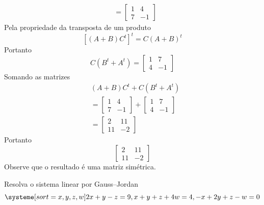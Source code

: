 \documentclass[a4paper,12pt,fleqn]{article}
\begin{document}
\begin{answer}
\begin{align*}
\\[2mm]
&=
\begin{bmatrix}
  1 & 4\\
  7 & -1
\end{bmatrix}
\end{align*}
Pela propriedade da transposta de um produto
\[
\left[(A+B)C^t\right]^t=C(A+B)^t
\]
Portanto
\[
C(B^t+A^t)=
\begin{bmatrix}
  1 & 7\\
  4 & -1
\end{bmatrix}
\]
Somando as matrizes
\begin{align*}
&(A+B)C^t+C(B^t+A^t)
\\[2mm]
&=
\begin{bmatrix}
  1 & 4\\
  7 & -1
\end{bmatrix}
+
\begin{bmatrix}
  1 & 7\\
  4 & -1
\end{bmatrix}
\\[2mm]
&=
\begin{bmatrix}
  2 & 11\\
  11 & -2
\end{bmatrix}
\end{align*}
Portanto
\[
\boxed{
\begin{bmatrix}
  2 & 11\\
  11 & -2
\end{bmatrix}
}
\]
Observe que o resultado é uma matriz simétrica.
\end{answer}

Resolva o sistema linear por Gauss--Jordan
\[
\systeme[sort={x,y,z,w}]{
  2x+y-z=9,
  x+y+z+4w=4,
  -x+2y+z-w=0
}
\]
\end{document}

